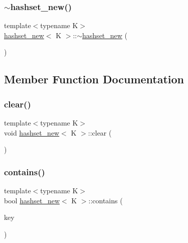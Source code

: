 \mbox{\label{classhashset__new_a20766c7defec2bd05247cb6c9e9e0e74}} 
\subsubsection{\texorpdfstring{$\sim$hashset\+\_\+new()}{~hashset\_new()}}
{\footnotesize\ttfamily template$<$typename K$>$ \\
\hyperlink{classhashset__new}{hashset\+\_\+new}$<$ K $>$\+::$\sim$\hyperlink{classhashset__new}{hashset\+\_\+new} (\begin{DoxyParamCaption}{ }\end{DoxyParamCaption})\hspace{0.3cm}{\ttfamily [inline]}}



\subsection{Member Function Documentation}
\mbox{\label{classhashset__new_a7abc43f557af1413d3da1784638f7cb6}} 
\subsubsection{\texorpdfstring{clear()}{clear()}}
{\footnotesize\ttfamily template$<$typename K$>$ \\
void \hyperlink{classhashset__new}{hashset\+\_\+new}$<$ K $>$\+::clear (\begin{DoxyParamCaption}{ }\end{DoxyParamCaption})\hspace{0.3cm}{\ttfamily [inline]}}

\mbox{\label{classhashset__new_add908f12655d92bb0b86127573014d84}} 
\subsubsection{\texorpdfstring{contains()}{contains()}}
{\footnotesize\ttfamily template$<$typename K$>$ \\
bool \hyperlink{classhashset__new}{hashset\+\_\+new}$<$ K $>$\+::contains (\begin{DoxyParamCaption}\item[{K $\ast$const}]{key }\end{DoxyParamCaption})\hspace{0.3cm}{\ttfamily [inline]}}

